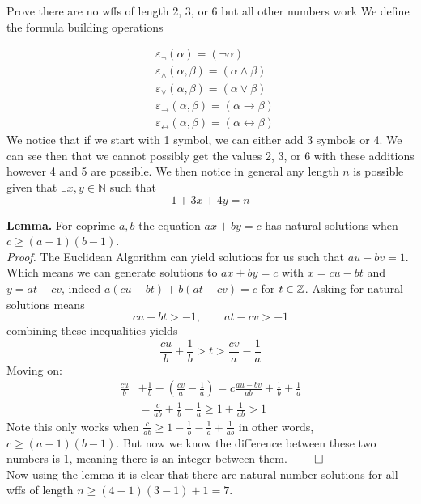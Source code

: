 
\def\name{Daniel Tobias}
\def\assignment{Introduction to Mathematical Logic}


\begin{problem}{1}{Prove there are no wffs of length 2, 3, or 6 but all other numbers work}
        We define the formula building operations

\begin{align}
    &\varepsilon_{\lnot}(\alpha) = (\lnot \alpha)\\
    &\varepsilon_{\land}(\alpha,\beta) = (\alpha \land \beta)\\
    &\varepsilon_{\lor}(\alpha, \beta) = (\alpha \lor \beta)\\
    &\varepsilon_{\rightarrow}(\alpha,\beta) = (\alpha \to \beta)\\
    &\varepsilon_{\leftrightarrow}(\alpha, \beta) = (\alpha \leftrightarrow \beta) 
\end{align}
We notice that if we start with 1 symbol, we can either add 3 symbols or 4. We can see then that we cannot possibly get the
values 2, 3, or 6 with these additions however 4 and 5 are possible. We then notice in general any length $n$ is possible given that $\exists x,y \in \mathbb{N}$ such that 
$$1 + 3x + 4y = n$$

\textbf{Lemma.} For coprime $a,b$ the equation $ax + by = c$ has natural solutions when $c \ge (a-1)(b-1)$.\\

\textit{Proof.} The Euclidean Algorithm can yield solutions for us such that $au -bv = 1$. Which means we can generate solutions to $ax + by = c$ with
$x = cu -bt$ and $y=at-cv$, indeed $a(cu-bt) + b(at-cv) = c$ for $t \in \mathbb{Z}$. Asking for
natural solutions means $$cu-bt > -1, \quad\quad at - cv > -1 $$
combining these inequalities yields $$\frac{cu}{b} + \frac{1}{b} > t > \frac{cv}{a} - \frac{1}{a}$$
Moving on:
\begin{align*}
    \frac{cu}{b} &+ \frac{1}{b} - \left(\frac{cv}{a} - \frac{1}{a}\right) = c \frac{au-bv}{ab} + \frac{1}{b} + \frac{1}{a}\\
    &= \frac{c}{ab} + \frac{1}{b} + \frac{1}{a} \ge 1 + \frac{1}{ab} > 1
\end{align*}
Note this only works when $\frac{c}{ab} \ge 1 - \frac{1}{b}-\frac{1}{a} + \frac{1}{ab}$ in other words, $c \ge (a-1)(b-1)$. But now we know the difference between these two numbers
is 1, meaning there is an integer between them. $\qed$\\

Now using the lemma it is clear that there are natural number solutions for all wffs of length $n \ge (4-1)(3-1) +1 = 7$.
\end{problem}
